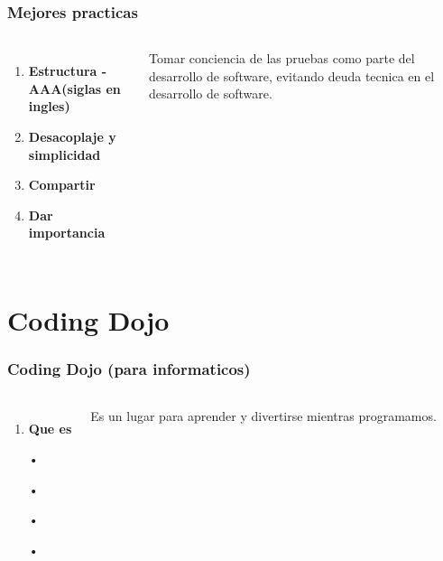 \documentclass{beamer}
\begin{document}
\begin{frame}
\frametitle{Mejores practicas}
\begin{columns}[c] %

\begin{enumerate}
\item \textbf{Estructura - AAA(siglas en ingles)}
\item \textbf{Desacoplaje y simplicidad}
\item \textbf{Compartir}
\item \textbf{Dar importancia}

\end{enumerate}

Tomar conciencia de las pruebas como parte del desarrollo de software, evitando deuda tecnica en el desarrollo de software.
\end{columns}
\end{frame}

\section{Coding Dojo}
\begin{frame}
\frametitle{Coding Dojo (para informaticos)}
\begin{columns}[c] %

\begin{enumerate}
\item \textbf{Que es}
\item[•]
\item[•]
\item[•]
\item[•]

\end{enumerate}

Es un lugar para aprender y divertirse mientras programamos.
\end{columns}
\end{frame}
\end{document}
